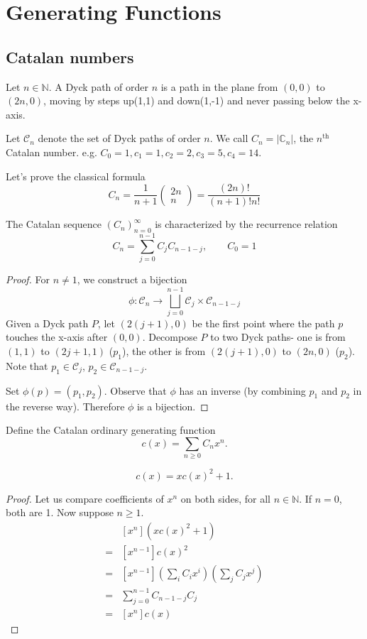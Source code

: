 \chapter{Generating Functions}
\section{Catalan numbers}
\begin{definition}
Let $n\in\mathbb{N}$. A Dyck path of order $n$ is a path in the plane from $(0,0)$ to $(2n,0)$, moving by steps up(1,1) and down(1,-1) and never passing below the x-axis. 

Let $\mathcal{C}_n$ denote the set of Dyck paths of order $n$. We call $C_n=|\mathbb{C}_n|$, the $n^\textrm{th}$ Catalan number. e.g. $C_0=1,c_1=1,c_2=2,c_3=5,c_4=14$. 
\end{definition}

Let's prove the classical formula 
$$C_n=\frac{1}{n+1}\begin{pmatrix}
2n\\n
\end{pmatrix}=\frac{(2n)!}{(n+1)!n!}$$

\begin{lemma}
The Catalan sequence $(C_n)_{n=0}^\infty$ is characterized by the recurrence relation 
$$C_n=\sum_{j=0}^{n-1}C_jC_{n-1-j},\qquad C_0=1$$
\end{lemma}
\begin{proof}
For $n\neq 1$, we construct a bijection 
$$\phi:\mathcal{C}_n\to \bigsqcup_{j=0}^{n-1}\mathcal{C}_j\times \mathcal{C}_{n-1-j}$$
Given a Dyck path $P$, let $(2(j+1),0)$ be the first point where the path $p$ touches the x-axis after $(0,0)$. Decompose $P$ to two Dyck paths- one is from $(1,1)$ to $(2j+1,1)$ ($p_1$), the other is from $(2(j+1),0)$ to $(2n,0)$ ($p_2$). Note that $p_1\in \mathcal{C}_j$, $p_2\in\mathcal{C}_{n-1-j}$. 

Set $\phi(p)=(p_1,p_2)$. Observe that $\phi$ has an inverse (by combining $p_1$ and $p_2$ in the reverse way). Therefore $\phi$ is a bijection.
\end{proof}

Define the Catalan ordinary generating function
$$c(x)=\sum_{n\geq 0}C_n x^n.$$

\begin{lemma}
$$c(x)=x c(x)^2 +1.$$
\end{lemma}
\begin{proof}
Let us compare coefficients of $x^n$ on both sides, for all $n\in\mathbb{N}$. If $n=0$, both are 1. Now suppose $n\geq 1$.
\begin{align*}
&[x^n](x c(x)^2+1)\\
=&[x^{n-1}]c(x)^2\\
=& [x^{n-1}](\sum_{i}C_ix^i)(\sum_{j}C_jx^j)\\
=& \sum_{j=0}^{n-1}C_{n-1-j}C_j\\
=& [x^n]c(x)
\end{align*}
\end{proof}

